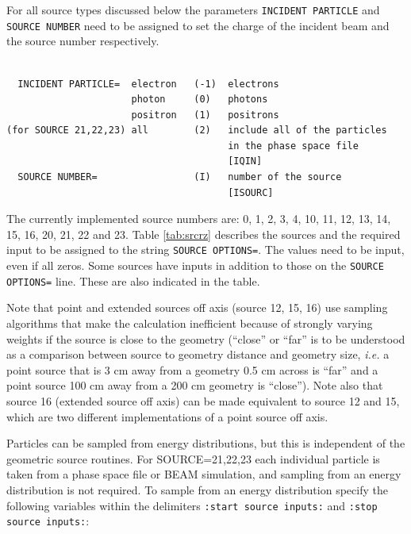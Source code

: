 \documentclass[12pt,twoside]{article}  %
\newcommand{\note}[1]{\mbox{}\\ \noindent \rule{16cm}{0.5mm} \\
{\em #1} \\ \noindent \rule{16cm}{0.5mm}\\
\typeout{******note: #1 *****}
}
\begin{document}
For all source types discussed below the parameters
\verb+INCIDENT PARTICLE+ and\\ \verb+SOURCE NUMBER+ need to be
assigned to set the charge of the incident beam and the
source number respectively.

\begin{verbatim}

  INCIDENT PARTICLE=  electron   (-1)  electrons
                      photon     (0)   photons
                      positron   (1)   positrons
(for SOURCE 21,22,23) all        (2)   include all of the particles
                                       in the phase space file
                                       [IQIN]
  SOURCE NUMBER=                 (I)   number of the source
                                       [ISOURC]
\end{verbatim}
The currently implemented source numbers are: 0, 1, 2, 3, 4, 10,
11, 12, 13, 14, 15, 16, 20, 21, 22 and 23. Table \ref{tab:srcrz}
describes the sources and the required input to be assigned to the
string \verb+SOURCE OPTIONS=+. The values need to be input, even if all
zeros.  Some sources have inputs in addition to those on the
\verb+SOURCE OPTIONS=+ line.  These are also indicated in the table.

Note that point and extended sources off axis (source 12, 15, 16) use
sampling algorithms that make the calculation inefficient because
of strongly varying weights if the source is close to the geometry
(``close'' or ``far'' is to be understood as a comparison between
source to geometry distance and geometry size, {\em i.e.} a point source
that is 3 cm away from a geometry 0.5 cm across is ``far'' and a point
source 100 cm away from a 200 cm geometry is ``close''). Note also
that source 16 (extended source off axis) can be made equivalent
to source 12 and 15, which are two different implementations of a point source
off axis.



Particles can be sampled from energy distributions, but this is
independent of the geometric source routines. For SOURCE=21,22,23
each individual particle is taken from a phase space file or BEAM
simulation, and
sampling from an energy distribution is not required.
To sample from an energy distribution specify the following variables
within the delimiters \verb+:start source inputs:+
and \verb+:stop source inputs:+:
\end{document}
